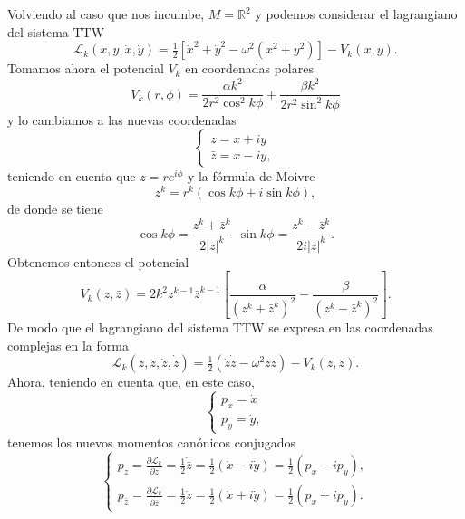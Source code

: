 \documentclass[12pt,a4paper,twoside]{article}
\theoremstyle{definition} \newtheorem{defn}[thm]{Definición}
\theoremstyle{definition} \newtheorem{ejemplo}[thm]{Ejemplo}
\theoremstyle{definition} \newtheorem{ejercicio}[thm]{Ejercicio}
\theoremstyle{remark} \newtheorem*{obs}{Observación}
\def\RR{\mathbb{R}}
\def\zz{\bar{z}}
\begin{document}
     Volviendo al caso que nos incumbe, $M=\RR^2$ y podemos considerar el lagrangiano del sistema TTW
     \begin{equation}
       \mathcal{L}_k(x,y,\dot{x},\dot{y})=\tfrac{1}{2}[\dot{x}^2+\dot{y}^2-\omega^2(x^2+y^2)]-V_k(x,y).
     \end{equation}
     Tomamos ahora el potencial $V_k$ en coordenadas polares
\begin{equation}
  V_k(r,\phi)=\frac{\alpha k^2}{2r^2\cos^2 k\phi}+\frac{\beta k^2}{2r^2\sin^2 k\phi}
\end{equation}
y lo cambiamos a las nuevas coordenadas
\begin{equation}
  \begin{cases}
    z=x+iy \\
    \bar{z}=x-iy,
  \end{cases}
\end{equation}
teniendo en cuenta que $z=r e^{i\phi}$ y la fórmula de Moivre
\begin{equation*}
  z^k=r^k(\cos k\phi+i\sin k\phi),
\end{equation*}
de donde se tiene
\begin{equation*}
  \cos k\phi = \frac{z^k+\zz^k}{2|z|^k} \ \  \sin k\phi = \frac{z^k-\zz^k}{2i|z|^k}. 
\end{equation*}
Obtenemos entonces el potencial
\begin{equation}
V_k(z,\zz)=2k^2z^{k-1}\zz^{k-1}\left[\frac{\alpha  }{(z^k+\zz^k)^2}-\frac{\beta  }{(z^k-\zz^k)^2}\right].
\end{equation}
De modo que el lagrangiano del sistema TTW se expresa en las coordenadas complejas en la forma
\begin{equation}
  \mathcal{L}_k(z,\zz,\dot{z},\dot{\zz})=\tfrac{1}{2}(\dot{z}\dot{\zz}-\omega^2 z \zz) - V_k(z,\zz).
\end{equation}
Ahora, teniendo en cuenta que, en este caso,
\begin{equation}
  \begin{cases}
    p_x=\dot{x}\\
    p_y=\dot{y},
  \end{cases}
\end{equation}
tenemos los nuevos momentos canónicos conjugados
\begin{equation}
  \begin{cases}
    p_z=\frac{\partial \mathcal{L}_k }{\partial \dot{z}}=\tfrac{1}{2} \dot{\zz}=\tfrac{1}{2}(\dot{x}-i\dot{y})=\tfrac{1}{2}(p_x-ip_y),\\
    p_{\zz}=\frac{\partial \mathcal{L}_k }{\partial \dot{\zz}}=\tfrac{1}{2} \dot{z}=\tfrac{1}{2}(\dot{x}+i\dot{y})=\tfrac{1}{2}(p_x+ip_y).
  \end{cases}
\end{equation}
\end{document}
